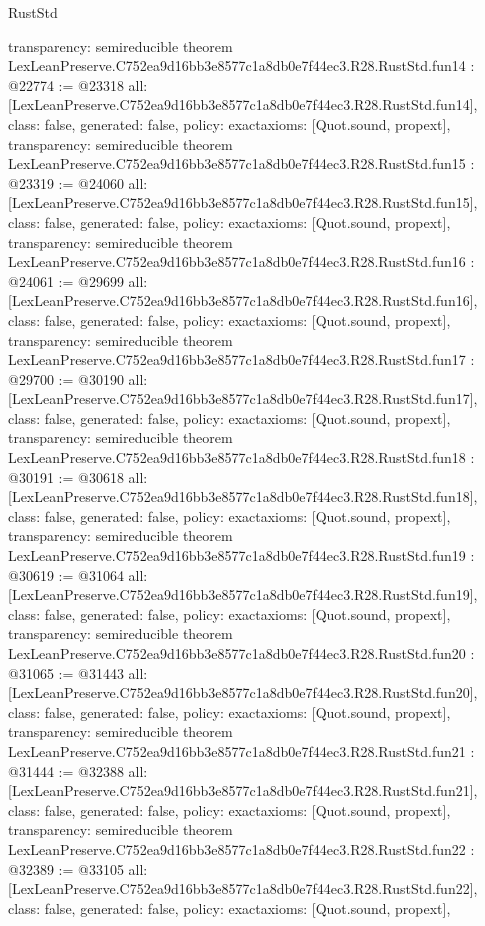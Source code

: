 \begin{lexlean}{RustStd}
\begin{coremodule}
{  transparency: semireducible
}
theorem LexLeanPreserve.C752ea9d16bb3e8577c1a8db0e7f44ec3.R28.RustStd.fun14 : @22774 := @23318 {
  all: [LexLeanPreserve.C752ea9d16bb3e8577c1a8db0e7f44ec3.R28.RustStd.fun14],
  class: false,
  generated: false,
  policy: exact{axioms: [Quot.sound, propext]},
  transparency: semireducible
}
theorem LexLeanPreserve.C752ea9d16bb3e8577c1a8db0e7f44ec3.R28.RustStd.fun15 : @23319 := @24060 {
  all: [LexLeanPreserve.C752ea9d16bb3e8577c1a8db0e7f44ec3.R28.RustStd.fun15],
  class: false,
  generated: false,
  policy: exact{axioms: [Quot.sound, propext]},
  transparency: semireducible
}
theorem LexLeanPreserve.C752ea9d16bb3e8577c1a8db0e7f44ec3.R28.RustStd.fun16 : @24061 := @29699 {
  all: [LexLeanPreserve.C752ea9d16bb3e8577c1a8db0e7f44ec3.R28.RustStd.fun16],
  class: false,
  generated: false,
  policy: exact{axioms: [Quot.sound, propext]},
  transparency: semireducible
}
theorem LexLeanPreserve.C752ea9d16bb3e8577c1a8db0e7f44ec3.R28.RustStd.fun17 : @29700 := @30190 {
  all: [LexLeanPreserve.C752ea9d16bb3e8577c1a8db0e7f44ec3.R28.RustStd.fun17],
  class: false,
  generated: false,
  policy: exact{axioms: [Quot.sound, propext]},
  transparency: semireducible
}
theorem LexLeanPreserve.C752ea9d16bb3e8577c1a8db0e7f44ec3.R28.RustStd.fun18 : @30191 := @30618 {
  all: [LexLeanPreserve.C752ea9d16bb3e8577c1a8db0e7f44ec3.R28.RustStd.fun18],
  class: false,
  generated: false,
  policy: exact{axioms: [Quot.sound, propext]},
  transparency: semireducible
}
theorem LexLeanPreserve.C752ea9d16bb3e8577c1a8db0e7f44ec3.R28.RustStd.fun19 : @30619 := @31064 {
  all: [LexLeanPreserve.C752ea9d16bb3e8577c1a8db0e7f44ec3.R28.RustStd.fun19],
  class: false,
  generated: false,
  policy: exact{axioms: [Quot.sound, propext]},
  transparency: semireducible
}
theorem LexLeanPreserve.C752ea9d16bb3e8577c1a8db0e7f44ec3.R28.RustStd.fun20 : @31065 := @31443 {
  all: [LexLeanPreserve.C752ea9d16bb3e8577c1a8db0e7f44ec3.R28.RustStd.fun20],
  class: false,
  generated: false,
  policy: exact{axioms: [Quot.sound, propext]},
  transparency: semireducible
}
theorem LexLeanPreserve.C752ea9d16bb3e8577c1a8db0e7f44ec3.R28.RustStd.fun21 : @31444 := @32388 {
  all: [LexLeanPreserve.C752ea9d16bb3e8577c1a8db0e7f44ec3.R28.RustStd.fun21],
  class: false,
  generated: false,
  policy: exact{axioms: [Quot.sound, propext]},
  transparency: semireducible
}
theorem LexLeanPreserve.C752ea9d16bb3e8577c1a8db0e7f44ec3.R28.RustStd.fun22 : @32389 := @33105 {
  all: [LexLeanPreserve.C752ea9d16bb3e8577c1a8db0e7f44ec3.R28.RustStd.fun22],
  class: false,
  generated: false,
  policy: exact{axioms: [Quot.sound, propext]},
}
\end{coremodule}
\end{lexlean}
